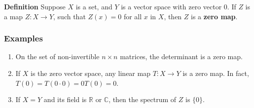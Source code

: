 \documentclass[12pt]{article}
\newcommand{\R}[0]{\mathbb{R}}
\newcommand{\C}[0]{\mathbb{C}}
\begin{document}
{\bf Definition}
Suppose $X$ is a set, and $Y$ is a vector space with zero vector $0$. 
If $Z$ is a map $Z:X\to Y$, such that $Z(x)=0$ for all $x$ in $X$,
then $Z$ is a {\bf zero map}.

\subsubsection{Examples}
\begin{enumerate}
\item On the set of non-invertible $n\times n$ matrices, the determinant
is a zero map.
\item If $X$ is the zero vector space, any linear map $T:X\to Y$ is
a zero map. In fact, $T(0)=T(0\cdot 0)=0T(0)=0$. 
\item If $X=Y$ and its field is $\R$ or $\C$, then the spectrum of $Z$ is
$\{0\}$. 
\end{enumerate}
\end{document}
